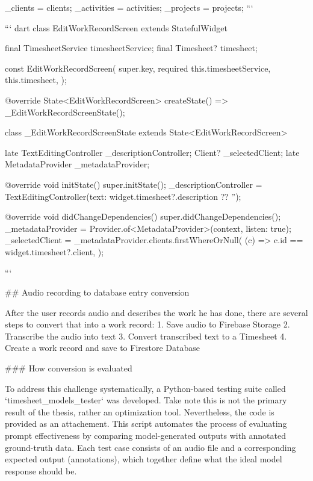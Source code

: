 \documentclass[
  digital,     %
  oneside,     %
  nosansbold,  %
  nocolorbold, %
  lof,         %
  lot,         %
]{fithesis4}
\begin{document}
\begin{markdown}
{{{      _clients = clients;
      _activities = activities;
      _projects = projects;
    }
  }
}
```

``` dart
class EditWorkRecordScreen extends StatefulWidget {
  final TimesheetService timesheetService;
  final Timesheet? timesheet;

  const EditWorkRecordScreen({
    super.key,
    required this.timesheetService,
    this.timesheet,
  });

  @override
  State<EditWorkRecordScreen> createState() => _EditWorkRecordScreenState();
}

class _EditWorkRecordScreenState extends State<EditWorkRecordScreen> {
  late TextEditingController _descriptionController;
  Client? _selectedClient;
  late MetadataProvider _metadataProvider;

  @override
  void initState() {
    super.initState();
    _descriptionController =
        TextEditingController(text: widget.timesheet?.description ?? '');
  }

  @override
  void didChangeDependencies() {
    super.didChangeDependencies();
    _metadataProvider = Provider.of<MetadataProvider>(context, listen: true);
    _selectedClient = _metadataProvider.clients.firstWhereOrNull(
      (c) => c.id == widget.timesheet?.client,
    );
  }
}
```

## Audio recording to database entry conversion

After the user records audio and describes the work he has done, there are several steps to convert that into a work record:
1. Save audio to Firebase Storage
2. Transcribe the audio into text
3. Convert transcribed text to a Timesheet
4. Create a work record and save to Firestore Database

### How conversion is evaluated

To address this challenge systematically, a Python-based testing suite called `timesheet_models_tester` was developed. Take note this is not the primary result of the thesis, rather an optimization tool. Nevertheless, the code is provided as an attachement. This script automates the process of evaluating prompt effectiveness by comparing model-generated outputs with annotated ground-truth data. Each test case consists of an audio file and a corresponding expected output (annotations), which together define what the ideal model response should be.


\end{markdown}
\end{document}
